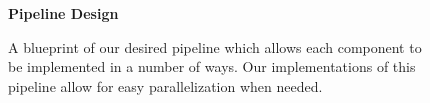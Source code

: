 \documentclass[runningheads,a4paper]{llncs}
\begin{document}
 \begin{figure}[t!]
    \begin{center}
    \textbf{Pipeline Design}
    \end{center}
    \caption{A blueprint of our desired pipeline which allows each component to be implemented in a number of ways. Our implementations of this pipeline allow for easy parallelization when needed. 
    }
\label{fig:pipeline_outline}
\end{figure}
\end{document}
